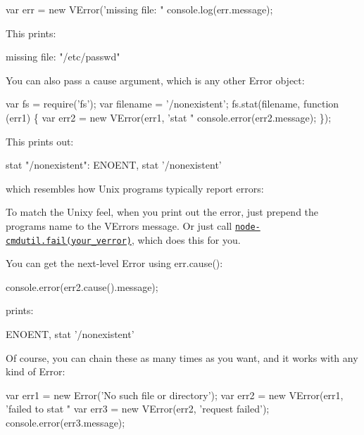 \begin{DoxyCode}
var err = new VError('missing file: "%
console.log(err.message);
\end{DoxyCode}


This prints\+: \begin{DoxyVerb}missing file: "/etc/passwd"
\end{DoxyVerb}


You can also pass a {\ttfamily cause} argument, which is any other Error object\+:


\begin{DoxyCode}
var fs = require('fs');
var filename = '/nonexistent';
fs.stat(filename, function (err1) \{
    var err2 = new VError(err1, 'stat "%
    console.error(err2.message);
\});
\end{DoxyCode}


This prints out\+: \begin{DoxyVerb}stat "/nonexistent": ENOENT, stat '/nonexistent'
\end{DoxyVerb}


which resembles how Unix programs typically report errors\+: 


To match the Unixy feel, when you print out the error, just prepend the program\textquotesingle{}s name to the V\+Error\textquotesingle{}s {\ttfamily message}. Or just call \href{https://github.com/joyent/node-cmdutil}{\tt node-\/cmdutil.\+fail(your\+\_\+verror)}, which does this for you.

You can get the next-\/level Error using {\ttfamily err.\+cause()}\+:


\begin{DoxyCode}
console.error(err2.cause().message);
\end{DoxyCode}


prints\+: \begin{DoxyVerb}ENOENT, stat '/nonexistent'
\end{DoxyVerb}


Of course, you can chain these as many times as you want, and it works with any kind of Error\+:


\begin{DoxyCode}
var err1 = new Error('No such file or directory');
var err2 = new VError(err1, 'failed to stat "%
var err3 = new VError(err2, 'request failed');
console.error(err3.message);
\end{DoxyCode}


